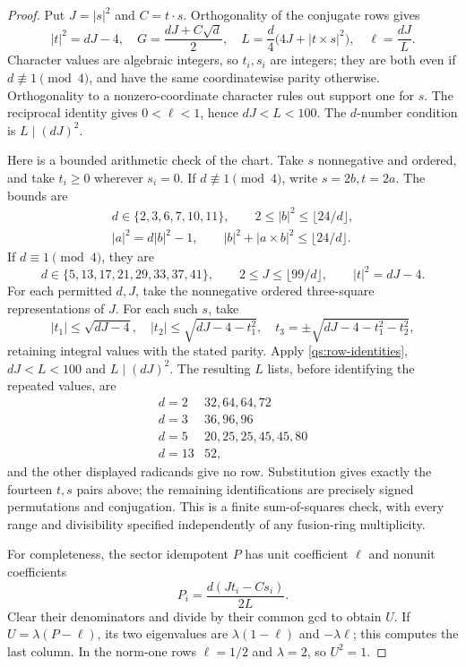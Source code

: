 \begin{proof}
Put $J=|s|^2$ and $C=t\cdot s$. Orthogonality of the conjugate rows gives
\begin{equation}\label{qs:row-identities}
 |t|^2=dJ-4,\quad
 G=\frac{dJ+C\sqrt d}{2},\quad
 L=\frac d4\bigl(4J+|t\times s|^2\bigr),\quad
 \ell=\frac{dJ}{L}.
\end{equation}
Character values are algebraic integers, so $t_i,s_i$ are integers;
they are both even if $d\not\equiv1\pmod4$, and have the same
coordinatewise parity otherwise. Orthogonality to a nonzero-coordinate
character rules out support one for $s$. The reciprocal identity gives
$0<\ell<1$, hence $dJ<L<100$. The $d$-number condition is
$L\mid(dJ)^2$.

Here is a bounded arithmetic check of the chart. Take $s$ nonnegative
and ordered, and take $t_i\ge0$ wherever $s_i=0$.
If $d\not\equiv1\pmod4$, write $s=2b,t=2a$. The bounds are
\[
\begin{gathered}
d\in\{2,3,6,7,10,11\},\qquad
2\le|b|^2\le\lfloor24/d\rfloor,\\
|a|^2=d|b|^2-1,\qquad
|b|^2+|a\times b|^2\le\lfloor24/d\rfloor.
\end{gathered}
\]
If $d\equiv1\pmod4$, they are
\[
 d\in\{5,13,17,21,29,33,37,41\},\qquad
 2\le J\le\lfloor99/d\rfloor,
 \qquad |t|^2=dJ-4.
\]
For each permitted $d,J$, take the nonnegative ordered three-square
representations of $J$. For each such $s$, take
\[
 |t_1|\le\sqrt{dJ-4},\quad
 |t_2|\le\sqrt{dJ-4-t_1^2},\quad
 t_3=\pm\sqrt{dJ-4-t_1^2-t_2^2},
\]
retaining integral values with the stated parity. Apply
\eqref{qs:row-identities}, $dJ<L<100$ and $L\mid(dJ)^2$.
The resulting $L$ lists, before identifying the repeated values, are
\[
\begin{array}{c|l}
d=2&32,64,64,72\\
d=3&36,96,96\\
d=5&20,25,25,45,45,80\\
d=13&52,
\end{array}
\]
and the other displayed radicands give no row. Substitution gives
exactly the fourteen $t,s$ pairs above; the remaining identifications are precisely signed permutations
and conjugation. This is a finite sum-of-squares check,
with every range and divisibility specified independently of any
fusion-ring multiplicity.

For completeness, the sector idempotent $P$ has unit coefficient
$\ell$ and nonunit coefficients
\[
 P_i=\frac{d(Jt_i-Cs_i)}{2L}.
\]
Clear their denominators and divide by their common gcd to obtain $U$.
If $U=\lambda(P-\ell)$, its two eigenvalues are
$\lambda(1-\ell)$ and $-\lambda\ell$; this computes the last column.
In the norm-one rows $\ell=1/2$ and $\lambda=2$, so $U^2=1$.
\end{proof}

